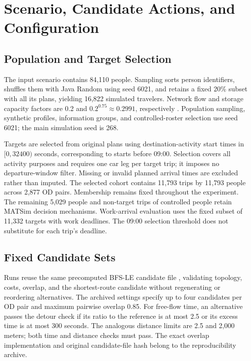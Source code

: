 \section{Scenario, Candidate Actions, and Configuration}
\label{app:configuration}

\subsection{Population and Target Selection}

The input scenario contains 84,110 people. Sampling sorts person identifiers, shuffles them with Java Random using seed 6021, and retains a fixed 20\% subset with all its plans, yielding 16,822 simulated travelers. Network flow and storage capacity factors are 0.2 and $0.2^{0.75}\approx0.2991$, respectively \cite{mersiniScalingMATSimTraffic2026,ben-dorPopulationDownscalingMultiagent2021}. Population sampling, synthetic profiles, information groups, and controlled-roster selection use seed 6021; the main simulation seed is 268.

Targets are selected from original plans using destination-activity start times in $[0,32400)$ seconds, corresponding to starts before 09:00. Selection covers all activity purposes and requires one car leg per target trip; it imposes no departure-window filter. Missing or invalid planned arrival times are excluded rather than imputed. The selected cohort contains 11,793 trips by 11,793 people across 2,877 OD pairs. Membership remains fixed throughout the experiment. The remaining 5,029 people and non-target trips of controlled people retain MATSim decision mechanisms. Work-arrival evaluation uses the fixed subset of 11,332 targets with work deadlines. The 09:00 selection threshold does not substitute for each trip's deadline.

\subsection{Fixed Candidate Sets}

Runs reuse the same precomputed BFS-LE candidate file \cite{rieser2013route}, validating topology, costs, overlap, and the shortest-route candidate without regenerating or reordering alternatives. The archived settings specify up to four candidates per OD pair and maximum pairwise overlap 0.85. For free-flow time, an alternative passes the detour check if its ratio to the reference is at most 2.5 or its excess time is at most 300 seconds. The analogous distance limits are 2.5 and 2,000 meters; both time and distance checks must pass. The exact overlap implementation and original candidate-file hash belong to the reproducibility archive.

